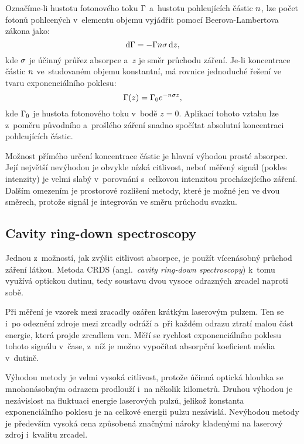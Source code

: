 Označíme-li hustotu fotonového toku $\Gamma$ a~hustotu pohlcujících
částic $n$, lze počet fotonů pohlcených v~elementu objemu vyjádřit
pomocí Beerova-Lambertova zákona jako:
\begin{equation}
	\label{eq:diagnostics-absorption-law}
	\dd\Gamma = - \Gamma n \sigma \, \dd z,
\end{equation}
kde $\sigma$ je účinný průřez absorpce a~$z$ je směr průchodu záření.
Je-li koncentrace částic $n$ ve~studovaném objemu konstantní,
má rovnice jednoduché řešení ve tvaru exponenciálního poklesu:
\begin{equation}
	\label{eq:diagnostics-absorption-flux}
	\Gamma (z) = \Gamma_0 e^{-n\sigma z},
\end{equation}
kde $\Gamma_0$ je hustota fotonového toku v~bodě $z = 0$.
Aplikací tohoto vztahu lze z~poměru původního a~prošlého záření snadno
spočítat absolutní koncentraci pohlcujících částic.

Možnost přímého určení koncentrace částic je hlavní výhodou prosté absorpce.
Její největší nevýhodou je obvykle nízká citlivost, neboť měřený signál
(pokles intenzity) je velmi slabý v~porovnání s~celkovou intenzitou
procházejícího záření.
Dalším omezením je prostorové rozlišení metody, které je možné jen
ve dvou směrech, protože signál je integrován ve směru průchodu svazku.

\subsection{Cavity ring-down spectroscopy}
\label{sec:diagnostics-crds}
Jednou z~možností, jak zvýšit citlivost absorpce, je použít vícenásobný
průchod záření látkou.
Metoda CRDS (angl.~\emph{cavity ring-down spectroscopy})
k~tomu využívá optickou dutinu, tedy soustavu dvou vysoce
odrazných zrcadel naproti sobě.

Při měření je vzorek mezi zracadly ozářen krátkým laserovým pulzem.
Ten se i~po odeznění zdroje mezi zrcadly odráží a~při každém odrazu
ztratí malou část energie, která projde zrcadlem ven.
Měří se rychlost exponenciálního poklesu tohoto signálu v~čase,
z~níž je možno vypočítat absorpční koeficient média v~dutině.

Výhodou metody je velmi vysoká citlivost, protože účinná optická hloub\-ka
se mnohonásobným odrazem prodlouží i~na několik kilometrů.
Druhou výhodou je nezávislost na fluktuaci energie laserových pulzů,
jelikož konstanta exponenciálního poklesu je na celkové energii
pulzu nezávislá.
Nevýhodou metody je především vysoká cena způsobená značnými nároky
kladenými na laserový zdroj i~kvalitu zrcadel.
\autocite{wiki-crds}

